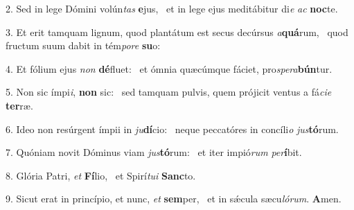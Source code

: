 2. Sed in lege Dómini volún\textit{tas} \textbf{e}jus, \ast\  et in lege ejus meditábitur di\textit{e} \textit{ac} \textbf{noc}te.\

3. Et erit tamquam lignum, quod plantátum est secus decúrsus \textit{a}\textbf{quá}rum, \ast\  quod fructum suum dabit in tém\textit{po}\textit{re} \textbf{su}o:\

4. Et fólium ejus \textit{non} \textbf{dé}fluet: \ast\  et ómnia quæcúmque fáciet, pro\textit{spe}\textit{ra}\textbf{bún}tur.\

5. Non sic ímpi\textit{i}, \textbf{non} sic: \ast\  sed tamquam pulvis, quem prójicit ventus a fá\textit{ci}\textit{e} \textbf{ter}ræ.\

6. Ideo non resúrgent ímpii in \textit{ju}\textbf{dí}cio: \ast\  neque peccatóres in concíli\textit{o} \textit{jus}\textbf{tó}rum.\

7. Quóniam novit Dóminus viam \textit{jus}\textbf{tó}rum: \ast\  et iter impió\textit{rum} \textit{per}\textbf{í}bit.\

8. Glória Patri, \textit{et} \textbf{Fí}lio, \ast\  et Spirí\textit{tu}\textit{i} \textbf{Sanc}to.\

9. Sicut erat in princípio, et nunc, \textit{et} \textbf{sem}per, \ast\  et in sǽcula sæcu\textit{ló}\textit{rum}. \textbf{A}men.\

